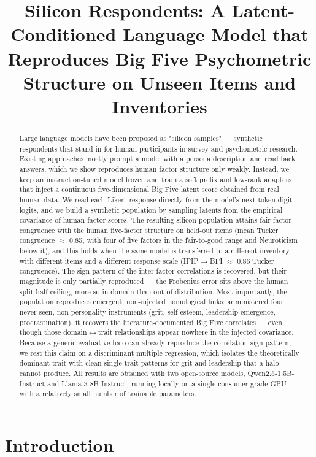 \documentclass[11pt]{article}
\title{Silicon Respondents: A Latent-Conditioned Language Model that Reproduces Big Five Psychometric Structure on Unseen Items and Inventories}
\author{}
\date{}
\begin{document}
\maketitle

\begin{abstract}
Large language models have been proposed as "silicon samples" --- synthetic respondents that stand in for human participants in survey and psychometric research. Existing approaches mostly prompt a model with a persona description and read back answers, which we show reproduces human factor structure only weakly. Instead, we keep an instruction-tuned model frozen and train a soft prefix and low-rank adapters that inject a continuous five-dimensional Big Five latent score obtained from real human data. We read each Likert response directly from the model's next-token digit logits, and we build a synthetic population by sampling latents from the empirical covariance of human factor scores. The resulting silicon population attains fair factor congruence with the human five-factor structure on held-out items (mean Tucker congruence $\approx$ 0.85, with four of five factors in the fair-to-good range and Neuroticism below it), and this holds when the same model is transferred to a different inventory with different items and a different response scale (IPIP$\rightarrow$BFI $\approx$ 0.86 Tucker congruence). The sign pattern of the inter-factor correlations is recovered, but their magnitude is only partially reproduced --- the Frobenius error sits above the human split-half ceiling, more so in-domain than out-of-distribution. Most importantly, the population reproduces emergent, non-injected nomological links: administered four never-seen, non-personality instruments (grit, self-esteem, leadership emergence, procrastination), it recovers the literature-documented Big Five correlates --- even though those domain$\leftrightarrow$trait relationships appear nowhere in the injected covariance. Because a generic evaluative halo can already reproduce the correlation sign pattern, we rest this claim on a discriminant multiple regression, which isolates the theoretically dominant trait with clean single-trait patterns for grit and leadership that a halo cannot produce. All results are obtained with two open-source models, Qwen2.5-1.5B-Instruct and Llama-3-8B-Instruct, running locally on a single consumer-grade GPU with a relatively small number of trainable parameters.
\end{abstract}

\section{Introduction}
\end{document}
